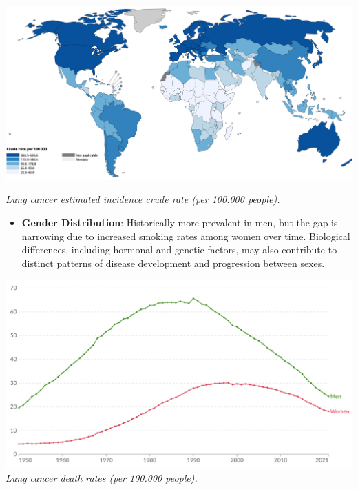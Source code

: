 \vspace{1em}
\begin{center}
    \includegraphics[width=1.00\textwidth]{../assets/01-overview/lc-crude-rate.png}

    \small\textit{Lung cancer estimated incidence crude rate (per 100.000 people). \cite{who2024}}
\end{center}
\vspace{1em}

\begin{itemize}
    \item \textbf{Gender Distribution}: Historically more prevalent in men, but the gap is narrowing 
    due to increased smoking rates among women over time. Biological differences, including hormonal 
    and genetic factors, may also contribute to distinct patterns of disease development and 
    progression between sexes.
\end{itemize}

\vspace{1em}
\begin{center}
    \includegraphics[width=1.00\textwidth]{../assets/01-overview/lc-death-men-vs-women.png}
    \small\textit{Lung cancer death rates (per 100.000 people). \cite{ourworldindata, who2024}}
\end{center}
\vspace{1em}

